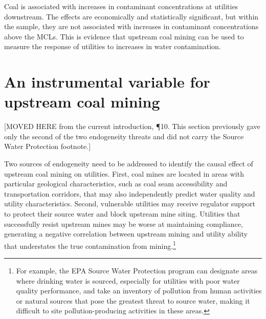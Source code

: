 \documentclass[12pt]{article}
\newcommand{\moved}[1]{%
  \par\nobreak\vspace{0.35em}%
  {\footnotesize\sffamily\color{movedcol}\raggedright #1\par}%
  \nobreak\vspace{-0.35em}\nobreak}
\begin{document}
Coal is associated with increases in contaminant concentrations at utilities downstream. The effects are economically and statistically significant, but within the sample, they are not associated with increases in contaminant concentrations above the MCLs. This is evidence that upstream coal mining can be used to measure the response of utilities to increases in water contamination.

\section{An instrumental variable for upstream coal mining}\label{sec:iv}

\moved{[MOVED HERE from the current introduction, \P10. This section previously gave
only the second of the two endogeneity threats and did not carry the Source Water
Protection footnote.]}
Two sources of endogeneity need to be addressed to identify the causal effect of upstream coal mining on utilities. First, coal mines are located in areas with particular geological characteristics, such as coal seam accessibility and transportation corridors, that may also independently predict water quality and utility characteristics. Second, vulnerable utilities may receive regulator support to protect their source water and block upstream mine siting. Utilities that successfully resist upstream mines may be worse at maintaining compliance, generating a negative correlation between upstream mining and utility ability that understates the true contamination from mining.\footnote{For example, the EPA Source Water Protection program can designate areas where drinking water is sourced, especially for utilities with poor water quality performance, and take an inventory of pollution from human activities or natural sources that pose the greatest threat to source water, making it difficult to site pollution-producing activities in these areas.}
\end{document}
